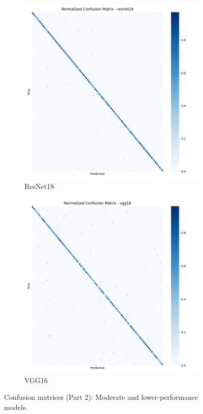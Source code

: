 \documentclass[11pt]{article}
\begin{document}
\begin{figure}[htbp]
\vspace{0.2cm}

\begin{subfigure}[b]{0.48\textwidth}
\includegraphics[width=\textwidth]{confusion_matrix_resnet18_full.png}
\caption{ResNet18}
\end{subfigure}
\hfill
\begin{subfigure}[b]{0.48\textwidth}
\includegraphics[width=\textwidth]{confusion_matrix_vgg16_full.png}
\caption{VGG16}
\end{subfigure}

\caption{Confusion matrices (Part 2): Moderate and lower-performance models.}
\label{fig:confusion_part2}
\end{figure}
\end{document}
